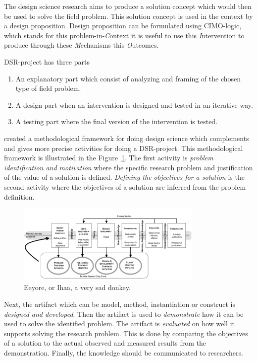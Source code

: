 The design science research aims to produce a solution concept which would then be used to solve the field problem. This solution concept is used in the context by a design proposition. Design proposition can be formulated using CIMO-logic, which stands for this problem-in-\emph{C}ontext it is useful to use this \emph{I}ntervention to produce through these \emph{M}echanisms this \emph{O}utcomes.

DSR-project has three parts \begin{enumerate}
\item An explanatory part which consist of analyzing and framing of the chosen type of field problem.
\item A design part when an intervention is designed and tested in an iterative way.
\item A testing part where the final version of the intervention is tested. \parencite{Aken:2014}
\end{enumerate}

\textcite{Peffers:2007} created a methodological framework for doing design science which complements and gives more precise activities for doing a DSR-project. This methodological framework is illustrated in the Figure~\ref{fig:dsrm-model}. The first activity is \emph{problem identification and motivation} where the specific research problem and justification of the value of a solution is defined. \emph{Defining the objectives for a solution} is the second activity where the objectives of a solution are inferred from the problem definition.

\begin{figure}[ht]
  \begin{center}
    \includegraphics[width=0.80\textwidth]{dippa/images/DSRM-model.png}
    \caption{Eeyore, or Ihaa, a very sad donkey.}
    \label{fig:dsrm-model}
  \end{center}
\end{figure}

Next, the artifact which can be model, method, instantiation or construct is \emph{designed and developed}. Then the artifact is used to \emph{demonstrate} how it can be used to solve the identified problem. The artifact is \emph{evaluated} on how well it supports solving the research problem. This is done by comparing the objectives of a solution to the actual observed and measured results from the demonstration. Finally, the knowledge should be communicated to researchers.

